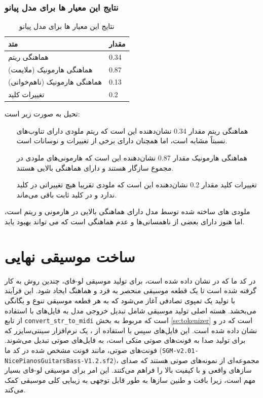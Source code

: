 \subsubsection{نتایج این معیار ها برای مدل پیانو}
\begin{table}
      \centering
      \caption{نتایج این معیار ها برای مدل پیانو}
      \label{resultPi}
      \begin{tabular}{|l|l|}
            \hline
            متد                          & مقدار \\ \hline
            هماهنگی ریتم                 & 0.34  \\ \hline
            هماهنگی هارمونیک (ملایمت)    & 0.87  \\ \hline
            هماهنگی هارمونیک (نا‌هم‌خوانی) & 0.13  \\ \hline
            تغییرات کلید                 & 0.2   \\ \hline
      \end{tabular}
\end{table}
تحیل   به صورت زیر است:
\begin{itemize}
      \item[هماهنگی ریتم] مقدار 0.34 نشان‌دهنده این است که ریتم ملودی دارای تناوب‌های نسبتاً مشابه است، اما همچنان دارای برخی از تغییرات و نوسانات است.
      \item[هماهنگی هارمونیک] مقدار 0.87 نشان‌دهنده این است که هارمونی‌های ملودی در مجموع سازگار هستند و دارای هماهنگی بالایی هستند.
      \item[تغییرات کلید] مقدار 0.2 نشان‌دهنده این است که ملودی تقریبا هیچ تغییراتی در کلید ندارد و در کلید ثابت باقی می‌ماند.
\end{itemize}

ملودی های ساخته شده توسط مدل دارای هماهنگی بالایی در هارمونی و ریتم است، اما هنوز دارای بعضی از ناهمسانی‌ها و عدم هماهنگی است که می تواند بهبود یابد.

\section{ساخت موسیقی نهایی}
در کد ما که در  نشان داده شده است، برای تولید موسیقی لو-فای، چندین روش به کار گرفته شده است
تا یک قطعه موسیقی منحصر به فرد و هماهنگ ایجاد شود. این فرآیند با تولید
یک تمپوی تصادفی آغاز می‌شود که به هر قطعه موسیقی تنوع و یگانگی می‌بخشد.
هسته اصلی تولید موسیقی شامل تبدیل خروجی مدل به فایل‌های  با استفاده
از تابع \texttt{convert\_str\_to\_midi} است که مربوط به بخش \ref{se:tokenizer} است که در  و  نشان داده شده است. این فایل‌های  سپس با
استفاده از ، یک نرم‌افزار سینتی‌سایزر که برای تولید صدا به
فونت‌های صوتی متکی است، به فایل‌های صوتی تبدیل می‌شوند. فونت‌های صوتی، مانند
فونت مشخص شده در کد ما
(\texttt{SGM-v2.01-NicePianosGuitarsBass-V1.2.sf2})، مجموعه‌ای از
نمونه‌های صوتی هستند که صدای سازهای واقعی و با کیفیت بالا را فراهم
می‌کنند. این امر برای موسیقی لو-فای بسیار مهم است، زیرا بافت و طنین سازها
به طور قابل توجهی به زیبایی کلی موسیقی کمک می‌کند.

